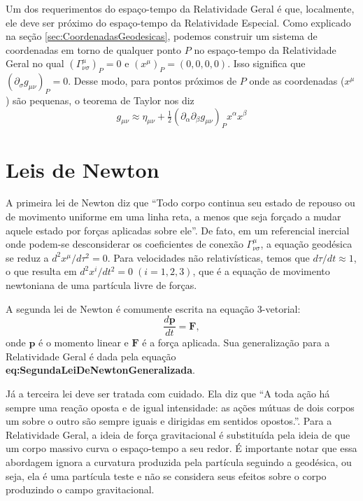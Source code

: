 Um dos requerimentos do espaço-tempo da Relatividade Geral é que, localmente, ele deve ser próximo do espaço-tempo da Relatividade Especial.  Como explicado na seção \ref{sec:CoordenadasGeodesicas}, podemos construir um sistema de coordenadas em torno de qualquer ponto $ P $ no espaço-tempo da Relatividade Geral no qual $ \left(\Gamma_{\nu \sigma}^{\mu}\right)_{P}=0 $ e $ \left(x^{\mu}\right)_{P}=(0,0,0,0) $. Isso significa que $ \left(\partial_{\sigma} g_{\mu \nu}\right)_{P}=0 $. Desse modo, para pontos próximos de $ P $ onde as coordenadas ($ x^\mu $) são pequenas, o teorema de Taylor nos diz
\begin{equation}\label{eq:TensorMetricaAproximado}
g_{\mu \nu} \approx \eta_{\mu \nu}+\tfrac{1}{2}\left(\partial_{\alpha} \partial_{\beta} g_{\mu \nu}\right)_{P} x^{\alpha} x^{\beta}
\end{equation}



\section{Leis de Newton}\label{sec:LeisDeNewton}

A primeira lei de Newton diz que ``Todo corpo continua seu estado de repouso ou de movimento uniforme em uma linha reta, a menos que seja forçado a mudar aquele estado por forças aplicadas sobre ele''. De fato, em um referencial inercial onde podem-se desconsiderar os coeficientes de conexão $ \Gamma^{\mu}_{\nu\sigma} $, a equação geodésica se reduz a $ d^{2} x^{\mu} / d \tau^{2}=0 $. Para velocidades não relativísticas, temos que $ d\tau/dt \approx 1$, o que resulta em $ d^{2} x^{i} / d t^{2}=0\;(i=1,2,3) $, que é a equação de movimento newtoniana de uma partícula livre de forças.

A segunda lei de Newton é comumente escrita na equação 3-vetorial:
\[\dfrac{d\mathbf{p}}{dt}=\mathbf{F} ,\]
onde $ \mathbf{p} $ é o momento linear e $ \mathbf{F} $ é a força aplicada. Sua generalização para a Relatividade Geral é dada pela equação \textbf{eq:SegundaLeiDeNewtonGeneralizada}.

Já a terceira lei deve ser tratada com cuidado. Ela diz que ``A toda ação há sempre uma reação oposta e de igual intensidade: as ações mútuas de dois corpos um sobre o outro são sempre iguais e dirigidas em sentidos opostos.''. Para a Relatividade Geral, a ideia de força gravitacional é substituída pela ideia de que um corpo massivo curva o espaço-tempo a seu redor. É importante notar que essa abordagem ignora a curvatura produzida pela partícula seguindo a geodésica, ou seja, ela é uma partícula teste e não se considera seus efeitos sobre o corpo produzindo o campo gravitacional.



